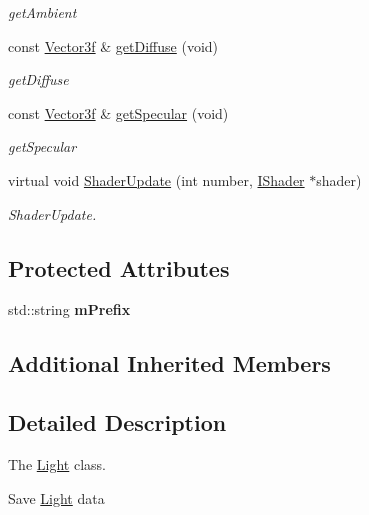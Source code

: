 \begin{DoxyCompactItemize}
\begin{DoxyCompactList}\small\item\em get\+Ambient \end{DoxyCompactList}\item 
const \hyperlink{classVector3}{Vector3f} \& \hyperlink{classEngine_1_1Light_af7fb6a05515cee4f2b69e8c67fc665d6}{get\+Diffuse} (void)
\begin{DoxyCompactList}\small\item\em get\+Diffuse \end{DoxyCompactList}\item 
const \hyperlink{classVector3}{Vector3f} \& \hyperlink{classEngine_1_1Light_a79cf67acee1d7df1ccfd4a8e5147ce76}{get\+Specular} (void)
\begin{DoxyCompactList}\small\item\em get\+Specular \end{DoxyCompactList}\item 
virtual void \hyperlink{classEngine_1_1Light_a25c1173c8877e6900f508791cb98217a}{Shader\+Update} (int number, \hyperlink{classEngine_1_1IShader}{I\+Shader} $\ast$shader)
\begin{DoxyCompactList}\small\item\em Shader\+Update. \end{DoxyCompactList}\end{DoxyCompactItemize}
\subsection*{Protected Attributes}
\begin{DoxyCompactItemize}
\item 
\hypertarget{classEngine_1_1Light_ac679f82de845df19724535ddaf913aba}{}std\+::string {\bfseries m\+Prefix}\label{classEngine_1_1Light_ac679f82de845df19724535ddaf913aba}

\end{DoxyCompactItemize}
\subsection*{Additional Inherited Members}


\subsection{Detailed Description}
The \hyperlink{classEngine_1_1Light}{Light} class. 

Save \hyperlink{classEngine_1_1Light}{Light} data 

